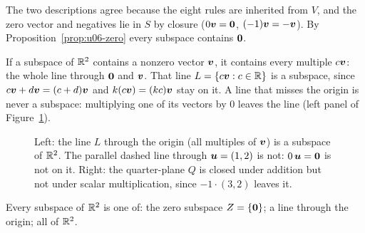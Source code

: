 The two descriptions agree because the eight rules are inherited from $V$, and the zero
vector and negatives lie in $S$ by closure ($0\boldsymbol{v}=\boldsymbol{0}$, $(-1)\boldsymbol{v}=-\boldsymbol{v}$). By
Proposition~\ref{prop:u06-zero} every subspace contains $\boldsymbol{0}$.

If a subspace of $\mathbb{R}^2$ contains a nonzero vector $\boldsymbol{v}$, it contains every multiple
$c\boldsymbol{v}$: the whole line through $\boldsymbol{0}$ and $\boldsymbol{v}$. That line $L=\{c\boldsymbol{v}:c\in\mathbb{R}\}$ is a
subspace, since $c\boldsymbol{v}+d\boldsymbol{v}=(c+d)\boldsymbol{v}$ and $k(c\boldsymbol{v})=(kc)\boldsymbol{v}$ stay on it. A line that
misses the origin is never a subspace: multiplying one of its vectors by $0$ leaves the line
(left panel of Figure~\ref{fig:u06-subspaces}).

\begin{figure}[ht]
\centering
{}
\qquad
{}
\caption{Left: the line $L$ through the origin (all multiples of $\boldsymbol{v}$) is a subspace of
$\mathbb{R}^2$. The parallel dashed line through $\boldsymbol{u}=(1,2)$ is not: $0\,\boldsymbol{u}=\boldsymbol{0}$ is not on it.
Right: the quarter-plane $Q$ is closed under addition but not under scalar multiplication,
since $-1\cdot(3,2)$ leaves it.}\label{fig:u06-subspaces}
\end{figure}

\begin{proposition}\label{prop:u06-R2}
Every subspace of $\mathbb{R}^2$ is one of: the zero subspace $Z=\{\boldsymbol{0}\}$; a line through the
origin; all of $\mathbb{R}^2$.
\end{proposition}

